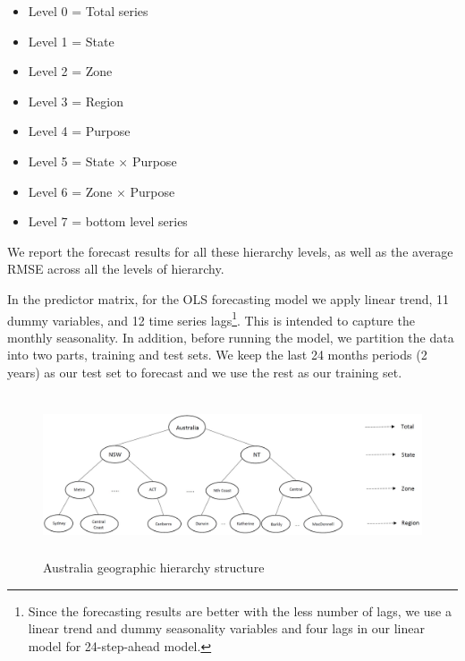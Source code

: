 \documentclass[11pt,a4paper,]{article}
\providecommand{\tightlist}{%
  \setlength{\itemsep}{0pt}\setlength{\parskip}{0pt}}
\begin{document}
\begin{itemize}
\tightlist
\item
  Level 0 = Total series
\item
  Level 1 = State
\item
  Level 2 = Zone
\item
  Level 3 = Region
\item
  Level 4 = Purpose
\item
  Level 5 = State \(\times\) Purpose
\item
  Level 6 = Zone \(\times\) Purpose
\item
  Level 7 = bottom level series
\end{itemize}

We report the forecast results for all these hierarchy levels, as well as the average RMSE across all the levels of hierarchy.

In the predictor matrix, for the OLS forecasting model we apply linear trend, 11 dummy variables, and 12 time series lags\footnote{Since the forecasting results are better with the less number of lags, we use a linear trend and dummy seasonality variables and four lags in our linear model for 24-step-ahead model.}. This is intended to capture the monthly seasonality. In addition, before running the model, we partition the data into two parts, training and test sets. We keep the last 24 months periods (2 years) as our test set to forecast and we use the rest as our training set.

\begin{figure}

{\centering \includegraphics[width=450px,height=180px]{Paper-Figures/Australian_hierarchy_structure} 

}

\caption{Australia geographic hierarchy structure}\label{fig:Australiahierarchystructure}
\end{figure}
\end{document}
